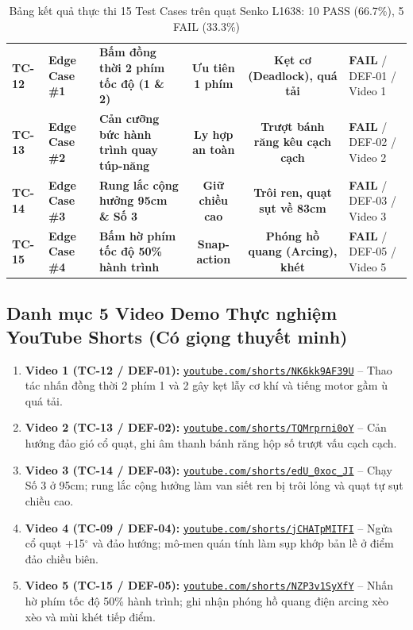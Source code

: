 \documentclass[11pt,a4paper]{article}
\begin{document}
\begin{table}[htbp]
\begin{tabularx}{\textwidth}{@{} l p{1.8cm} X c c p{3.2cm} @{}}
\textbf{TC-12} & \textbf{Edge Case \#1} & \textbf{Bấm đồng thời 2 phím tốc độ (1 \& 2)} & \textbf{Ưu tiên 1 phím} & \textbf{Kẹt cơ (Deadlock), quá tải} & \textbf{\color{failred}FAIL} / DEF-01 / Video 1 \\
\textbf{TC-13} & \textbf{Edge Case \#2} & \textbf{Cản cưỡng bức hành trình quay túp-năng} & \textbf{Ly hợp an toàn} & \textbf{Trượt bánh răng kêu cạch cạch} & \textbf{\color{failred}FAIL} / DEF-02 / Video 2 \\
\textbf{TC-14} & \textbf{Edge Case \#3} & \textbf{Rung lắc cộng hưởng 95cm \& Số 3} & \textbf{Giữ chiều cao} & \textbf{Trôi ren, quạt sụt về 83cm} & \textbf{\color{failred}FAIL} / DEF-03 / Video 3 \\
\textbf{TC-15} & \textbf{Edge Case \#4} & \textbf{Bấm hờ phím tốc độ 50\% hành trình} & \textbf{Snap-action} & \textbf{Phóng hồ quang (Arcing), khét} & \textbf{\color{failred}FAIL} / DEF-05 / Video 5 \\
\bottomrule
\end{tabularx}
\caption{Bảng kết quả thực thi 15 Test Cases trên quạt Senko L1638: 10 PASS (66.7\%), 5 FAIL (33.3\%)}
\end{table}

\subsection{Danh mục 5 Video Demo Thực nghiệm YouTube Shorts (Có giọng thuyết minh)}
\begin{enumerate}
    \item \textbf{Video 1 (TC-12 / DEF-01):} \href{https://youtube.com/shorts/NK6kk9AF39U?feature=share}{\nolinkurl{youtube.com/shorts/NK6kk9AF39U}} -- Thao tác nhấn đồng thời 2 phím 1 và 2 gây kẹt lẫy cơ khí và tiếng motor gầm ù quá tải.
    \item \textbf{Video 2 (TC-13 / DEF-02):} \href{https://youtube.com/shorts/TQMrprni0oY?feature=share}{\nolinkurl{youtube.com/shorts/TQMrprni0oY}} -- Cản hướng đảo gió cổ quạt, ghi âm thanh bánh răng hộp số trượt vấu cạch cạch.
    \item \textbf{Video 3 (TC-14 / DEF-03):} \href{https://youtube.com/shorts/edU_0xoc_JI?feature=share}{\nolinkurl{youtube.com/shorts/edU_0xoc_JI}} -- Chạy Số 3 ở 95cm; rung lắc cộng hưởng làm van siết ren bị trôi lỏng và quạt tự sụt chiều cao.
    \item \textbf{Video 4 (TC-09 / DEF-04):} \href{https://youtube.com/shorts/jCHATpMITFI?feature=share}{\nolinkurl{youtube.com/shorts/jCHATpMITFI}} -- Ngửa cổ quạt +15$^\circ$ và đảo hướng; mô-men quán tính làm sụp khớp bản lề ở điểm đảo chiều biên.
    \item \textbf{Video 5 (TC-15 / DEF-05):} \href{https://youtube.com/shorts/NZP3v1SyXfY?feature=share}{\nolinkurl{youtube.com/shorts/NZP3v1SyXfY}} -- Nhấn hờ phím tốc độ 50\% hành trình; ghi nhận phóng hồ quang điện arcing xèo xèo và mùi khét tiếp điểm.
\end{enumerate}
\end{document}
